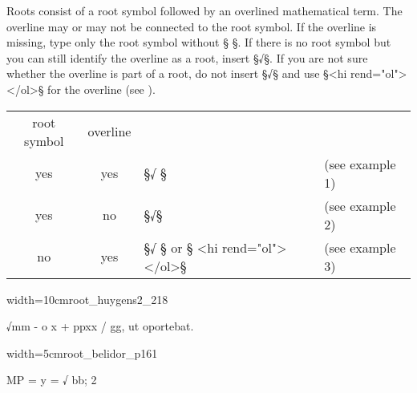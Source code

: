 \begin{clarification}
Roots consist of a root symbol followed by an overlined mathematical term. The overline may or may not be connected to the root symbol.
If the overline is missing, type only the root symbol without §{ }§.
If there is no root symbol but you can still identify the overline as a root, insert §√§. If you are not sure whether the overline is part of a root, do not insert §√§ and use §<hi rend="ol"> </ol>§ for the overline (see ).
\end{clarification}

\vspace{3mm}
\begin{tabelle}

\vspace{-1mm}
\begin{tabular}{@{}cc@{\qquad}l@{\qquad}l}
root symbol & overline & & \\[2mm]
yes & yes & §√{ }§ & (see example 1) \\[1mm]
yes & no & §√§ & (see example 2) \\[1mm]
no & yes & §√{ }§ or § <hi rend="ol"> </ol>§ & (see example 3) \\
\end{tabular}
\end{tabelle}

\vspace{7mm}
\begin{sampleImageSmall}{width=10cm}{root_huygens2_218}
\begin{typeLatin}
√mm - o x + \lwr ppxx / gg, ut oportebat.
\end{typeLatin}
\end{sampleImageSmall}

\vspace{3mm}
\begin{sampleImageSmall}{width=5cm}{root_belidor_p161}
\begin{typeLatin}
MP = y =  √ \bold{\{}bb;\bold{\}} \bold{/} 2 
\end{typeLatin}
\end{sampleImageSmall}


